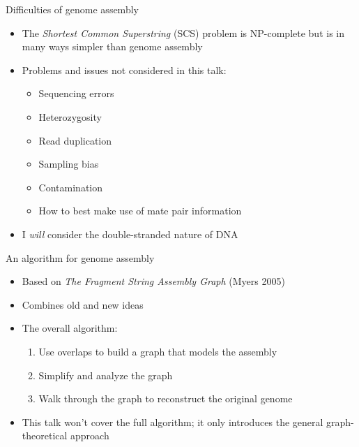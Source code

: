 \documentclass[xcolor=dvipsnames]{beamer}
\begin{document}
\begin{frame}{Difficulties of genome assembly}
    \begin{itemize}
        \item The {\em Shortest Common Superstring} (SCS) problem is NP-complete
            but is in many ways simpler than genome assembly
        \item Problems and issues not considered in this talk:
            \begin{itemize}
                \item Sequencing errors
                \item Heterozygosity
                \item Read duplication
                \item Sampling bias
                \item Contamination
                \item How to best make use of mate pair information
            \end{itemize}
        \item I {\em will} consider the double-stranded nature of DNA
    \end{itemize}
\end{frame}

\begin{frame}{An algorithm for genome assembly}
    \begin{itemize}
        \item Based on {\it The Fragment String Assembly Graph} (Myers 2005)
        \item Combines old and new ideas
        \item The overall algorithm:
        \begin{enumerate}
            \item Use overlaps to build a graph that models the assembly
            \item Simplify and analyze the graph
            \item Walk through the graph to reconstruct the original genome
        \end{enumerate}
        \item This talk won't cover the full algorithm; it only introduces the
              general graph-theoretical approach
    \end{itemize}
\end{frame}
\end{document}
